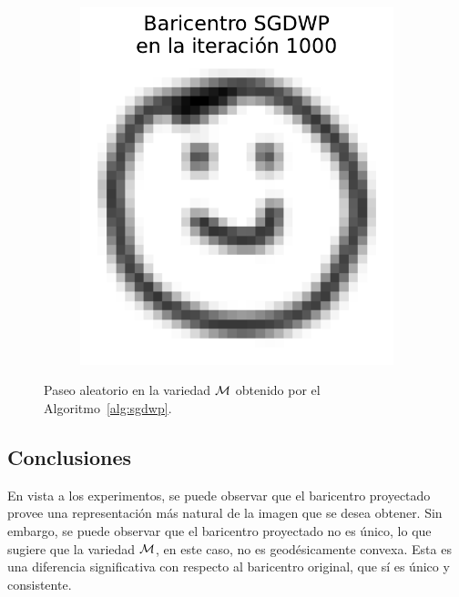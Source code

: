 \begin{figure}[H]
\begin{subfigure}[b]{0.17\textwidth}
        \label{fig:bar-SGDWP-random-walk-iter-09}
    \end{subfigure}
    \hfill
    \begin{subfigure}[b]{0.17\textwidth}
        \centering
        \includegraphics[width=\textwidth]{img/sgdwp-rw/bar-SGDWP-random-walk-iter-10.pdf}
        \label{fig:bar-SGDWP-random-walk-iter-10}
    \end{subfigure}
    \caption{Paseo aleatorio en la variedad $\operatorname{\mathcal{M}}$ obtenido por el Algoritmo~\ref{alg:sgdwp}.}
    \label{fig:bar-SGDWP-random-walk}
\end{figure}


\subsection{Conclusiones}\label{ssec:sgdwp-conclusiones}  %

En vista a los experimentos, se puede observar que el baricentro proyectado provee una representación más natural de la imagen que se desea obtener.
Sin embargo, se puede observar que el baricentro proyectado no es único, lo que sugiere que la variedad $\operatorname{\mathcal{M}}$, en este caso, no es geodésicamente convexa. Esta es una diferencia significativa con respecto al baricentro original, que sí es único y consistente.


